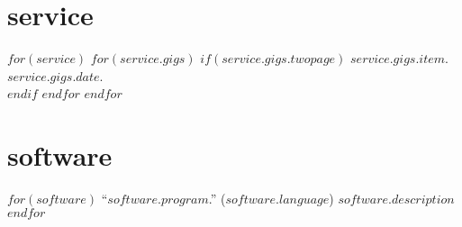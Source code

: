 \documentclass[11pt, a4paper]{article}
\begin{document}
\section{service}
$for(service)$
$for(service.gigs)$
$if(service.gigs.twopage)$
$service.gigs.item$. $service.gigs.date$.\\[.15cm]
$endif$
$endfor$
$endfor$

\section{software}

$for(software)$
``$software.program$.'' ($software.language$) $software.description$\\[.1cm]
$endfor$
\end{document}
